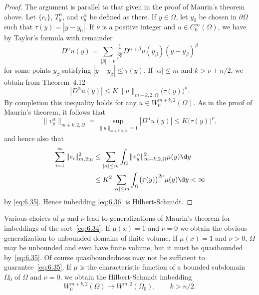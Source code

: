 \begin{proof}
  The argument is parallel to that given in the proof of Maurin's theorem above.
  Let $\{e_i\}$, $T_y^\alpha$, and $v_y^\alpha$ be defined as there. If $y\in\Omega$,
  let $y_0$ be chosen in $\partial\Omega$ such that $\tau(y) = |y-y_0|$.
  If $\nu$ is a positive integer and $u\in C_0^\infty(\Omega)$, we have by Taylor's
  formula with remainder
  \[ D^\alpha u(y) = \sum_{|\beta|=\nu} \frac{1}{\beta!} D^{\alpha+\beta}
      u(y_{\beta}) (y-y_{\beta})^\beta \]
  for some points $y_\beta$ satisfying $|y-y_\beta|\leq\tau(y)$.
  If $|\alpha|\leq m$ and $k>\nu+n/2$, we obtain from Theorem~4.12
  \[ |D^\alpha u(y)| \leq K\|u\|_{m+k,2,\Omega} \bigl(\tau(y)\bigr)^\nu. \]
  By completion this inequality holds for any $u\in W_0^{m+k,2}(\Omega)$.
  As in the proof of Maurin's theorem, it follows that
  \[ \|v_y^\alpha\|_{m+k,2,\Omega} = \sup_{\|u\|_{m+k,2,\Omega}=1} |D^\alpha u(y)|
      \leq K \bigl(\tau(y)\bigr)^\nu, \]
  and hence also that
  \begin{align*}
    \sum_{i=1}^\infty \|e_i\|_{m,2;\mu}^2
    & \leq \sum_{|\alpha|\leq m} \int_{\Omega} \|v_y^\alpha\|_{m+k,2,\Omega}^2 \mu(y) \d y \\
    & \leq K^2 \sum_{|\alpha|\leq m} \int_{\Omega} \bigl(\tau(y)\bigr)^{2\nu} \mu(y) \d y<\infty
  \end{align*}
  by \eqref{eq:6.35}. Hence imbedding \eqref{eq:6.36} is Hilbert-Schmidt.
\end{proof}


\begin{remark}
  Various choices of $\mu$ and $\nu$ lead to generalizations of Maurin's theorem
  for imbeddings of the sort~\eqref{eq:6.34}. If $\mu(x)=1$ and $\nu=0$ we obtain
  the obvious generalization to unbounded domains of finite volume. If $\mu(x)=1$
  and $\nu>0$, $\Omega$ may be unbounded and even have finite volume, but it must
  be quasibounded by~\eqref{eq:6.35}. Of course quasiboundedness may not be sufficient
  to guarantee~\eqref{eq:6.35}. If $\mu$ is the characteristic function of a
  bounded subdomain $\Omega_0$ of $\Omega$ and $\nu=0$, we obtain the Hilbert-Schmidt
  imbedding
  \[ W_0^{m+k,2}(\Omega) \to W^{m,2}(\Omega_0), \qquad k>n/2. \]
\end{remark}